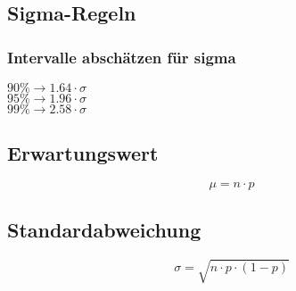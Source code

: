 	\subsection{Sigma-Regeln}
	\subsubsection{Intervalle abschätzen für sigma}
	\begin{center}
	$90\% \rightarrow 1.64 \cdot \sigma$ \\
	$95\% \rightarrow 1.96 \cdot \sigma$ \\
	$99\% \rightarrow 2.58 \cdot \sigma$
	\end{center}
	
	\subsection{Erwartungswert}
	$$ \mu = n \cdot p $$
	\subsection{Standardabweichung}
	$$ \sigma = \sqrt{n \cdot p \cdot (1-p)} $$
